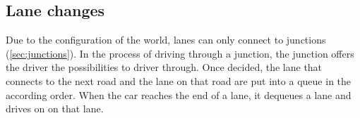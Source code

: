 \subsection{Lane changes}
\label{sec:laneChanges}

Due to the configuration of the world, lanes can only connect to junctions
(\ref{sec:junctions}). In the process of driving through a junction, the 
junction offers the driver the possibilities to driver through. Once decided,
the lane that connects to the next road and the lane on that road are put 
into a queue in the according order. When the car reaches the end of a lane, 
it dequeues a lane and drives on on that lane.

